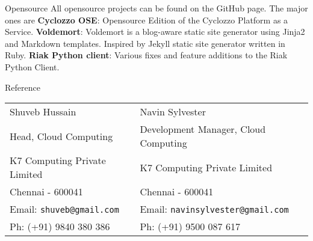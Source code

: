 \documentclass{resume}
\begin{document}
\newpage


\begin{category}{Opensource}
  \citemnobullet All opensource projects can be found on the GitHub page. The major ones are
  \citembullet \textbf{Cyclozzo OSE}: Opensource Edition of the Cyclozzo Platform as a Service.
  \citembullet \textbf{Voldemort}: Voldemort is a blog-aware static site generator using Jinja2 
  and Markdown templates. Inspired by Jekyll static site generator written in Ruby.
  \citembullet \textbf{Riak Python client}: Various fixes and feature additions to the Riak Python Client.
\end{category}


\begin{category}{Reference}
  \citemnobullet \\
  \begin{tabular}{ll}Shuveb Hussain&Navin Sylvester\\
    Head, Cloud Computing&Development Manager, Cloud Computing\\
    K7 Computing Private Limited&K7 Computing Private Limited\\
    Chennai - 600041&Chennai - 600041\\
    Email: \mbox{\small\tt shuveb@gmail.com}&Email: \mbox{\small\tt navinsylvester@gmail.com}\\
    Ph: (+91) 9840 380 386&Ph: (+91) 9500 087 617
  \end{tabular}
\end{category}
\end{document}
